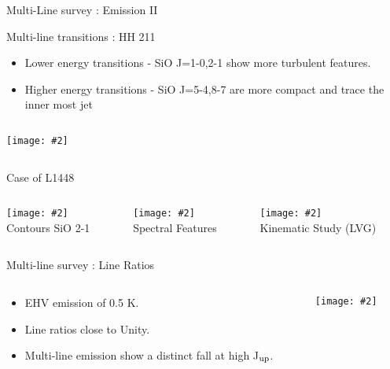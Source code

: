 \documentclass[8pt,xcolor=dvipsnames]{beamer}
\newcommand{\figpath}{./NEWFIGS/}
\newcommand{\spic}[2]{\texttt{[image: \#2]}}
\newcommand{\myref}[1]{{\small{\color{red}{(#1)}}}}
\begin{document}
\begin{frame}{Multi-Line survey : Emission II}
\begin{block}{Multi-line transitions : HH 211}
\begin{itemize}
\item Lower energy transitions - SiO J=1-0,2-1 show more turbulent
  features.\myref{Chandler 2001}
\item Higher energy transitions - SiO J=5-4,8-7 are more compact and
  trace the inner most jet \myref{Hirano 2006, Palau 2006, Nisini 2007}
\end{itemize}
\end{block}
\begin{columns}
\begin{column}{0.95\textwidth}
\spic{0.24}{/Users/bhargavvaidya/MyProject/work/Leeds_Uni/SiOJets_New/PAPER/PFIGS/imshkvcontomaps.png}
\end{column}
\end{columns}
\end{frame}

\begin{frame}{Case of L1448 \myref{Nisini 2007}}
\begin{columns}[t]
\begin{column}{0.25\textwidth}
\spic{0.1}{\figpath/Nisini2007_f1.pdf}\\
Contours SiO 2-1
\end{column}

\begin{column}{0.40\textwidth}
 \spic{0.25}{\figpath/Nisini2007_f4.pdf}\\
 Spectral Features
\end{column}

\begin{column}{0.25\textwidth}
\spic{0.25}{\figpath/Nisini2007_f6.pdf} \\
Kinematic Study (LVG) 
\end{column}

\end{columns}
\end{frame}

\begin{frame}{Multi-line survey : Line Ratios}

\begin{columns}[T]
\begin{column}{0.35\textwidth}
\begin{itemize}
\item EHV emission of 0.5 K.
\item Line ratios close to Unity. 
\item Multi-line emission show a distinct fall at high J$_{\rm up}$.
\end{itemize}
\end{column}
\hfill


\begin{column}{0.75\textwidth}
\spic{0.28}{\figpath/pfig14.pdf} 
\end{column}
\hfill


\end{columns}

\end{frame}
\end{document}
